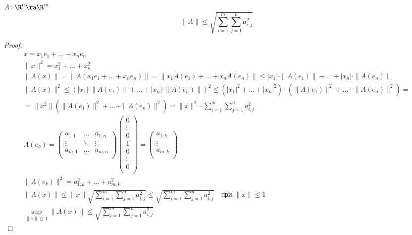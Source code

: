 \begin{theorem}
	$A \colon \R^n \ra \R^m$
	\[ \|A\| \le \sqrt{\sum_{i = 1}^m \sum_{j = 1}^n a_{i, j}^2} \]
\end{theorem}
\begin{proof}
	\begin{gather*}
		x = x_1e_1 + \dots + x_n e_n \\
		\|x\|^2 = x_1^2 + \dots + x_n^2 \\
		\|A(x)\| = \|A(x_1e_1 + \dots + x_n e_n)\|
			= \|x_1A(e_1) + \dots + x_nA(e_n)\| \le |x_1| \cdot \|A(e_1)\| + \dots + |x_n| \cdot \|A(e_n)\| \\
		\|A(x)\|^2 \le (|x_1| \cdot \|A(e_1)\| + \dots + |x_n| \cdot \|A(e_n)\|) ^ 2
			\le (|x_1| ^ 2 + \dots + |x_n|^2) \cdot (\|A(e_1)\|^2 + \dots + \|A(e_n)\|^2) = \\
		= \|x^2\| (\|A(e_1)\|^2 + \dots + \|A(e_n)\|^2) = \|x\|^2 \cdot \sum_{i = 1}^m \sum_{j = 1}^n a_{i, j}^2 \\
		A(e_k) =
			\begin{pmatrix}
				a_{1, 1} & \dots & a_{1, n}\\
				\vdots & \ddots & \vdots\\
				a_{m, 1} & \dots & a_{m, n}\\
			\end{pmatrix}
			\begin{pmatrix}
				0\\
				\vdots\\
				0\\
				1\\
				0\\
				\vdots\\
				0\\
			\end{pmatrix}
			=
			\begin{pmatrix}
				a_{1, k}\\
				\vdots\\
				a_{m, k}\\
			\end{pmatrix} \\
		\|A(e_k)\|^2 = a_{1, k}^2 + \dots + a_{m, k}^2 \\
		\|A(x)\| \le \|x\|\sqrt{\sum_{i = 1}^m \sum_{j = 1}^n a_{i, j}^2}
			\le \sqrt{\sum_{i = 1}^m \sum_{j = 1}^n a_{i, j}^2} \quad \text{при $\|x\| \le 1$} \\
		\sup_{\|x\| \le 1}\|A(x)\| \le \sqrt{\sum_{i = 1}^m \sum_{j = 1}^n a_{i, j}^2}
	\end{gather*}
\end{proof}

